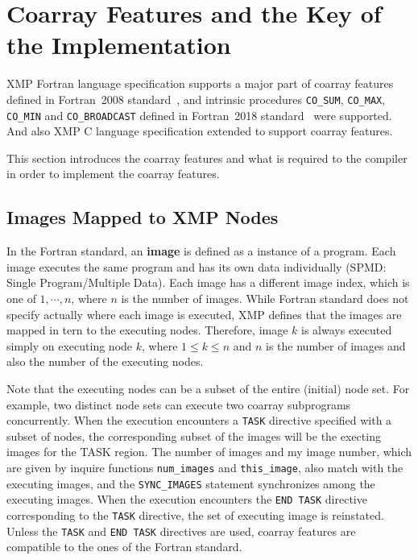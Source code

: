 \newcommand{\requirement}{{\bf Requirement to the compiler.} }


\section{Coarray Features and the Key of the Implementation}\label{sec:lang}

XMP Fortran language specification supports a major part of coarray features defined in 
Fortran~2008 standard~\cite{F08}, and intrinsic procedures 
{\tt CO\_SUM}, {\tt CO\_MAX}, {\tt CO\_MIN} and {\tt CO\_BROADCAST} defined in 
Fortran~2018 standard~\cite{F18} were supported.
And also XMP C language specification extended to support coarray features.

This section introduces the coarray features and what is required
to the compiler in order to implement the coarray features.


\subsection{Images Mapped to XMP Nodes}

In the Fortran standard, an {\bf image} is defined as a instance of a program. 
Each image executes the same program and has its own data individually 
(SPMD: Single Program/Multiple Data).
Each image has a different image index, which is one of $1, \cdots, n$, 
where $n$ is the number of images. 
While Fortran standard does not specify actually where each image is executed, 
XMP defines that the images are mapped in tern to the executing nodes. 
Therefore, image $k$ is always executed simply on executing node $k$, 
where $1 \leq k \leq n$ and 
$n$ is the number of images and also the number of the executing nodes. 

Note that the executing nodes can be a subset of the entire (initial) node set. 
For example, two distinct node sets can execute two coarray subprograms concurrently.
When the execution encounters a {\tt TASK} directive specified with a subset of nodes,
the corresponding subset of the images will be the execting images for the
TASK region. 
The number of images and my image number, which are given by inquire functions
{\tt num\_images} and {\tt this\_image}, also match with the executing images, and
the {\tt SYNC\_IMAGES} statement synchronizes among the executing images.
When the execution encounters the {\tt END TASK} directive corresponding to the
{\tt TASK} directive, the set of executing image is reinstated.
Unless the {\tt TASK} and {\tt END TASK} directives are used, coarray features are 
compatible to the ones of the Fortran standard. 

